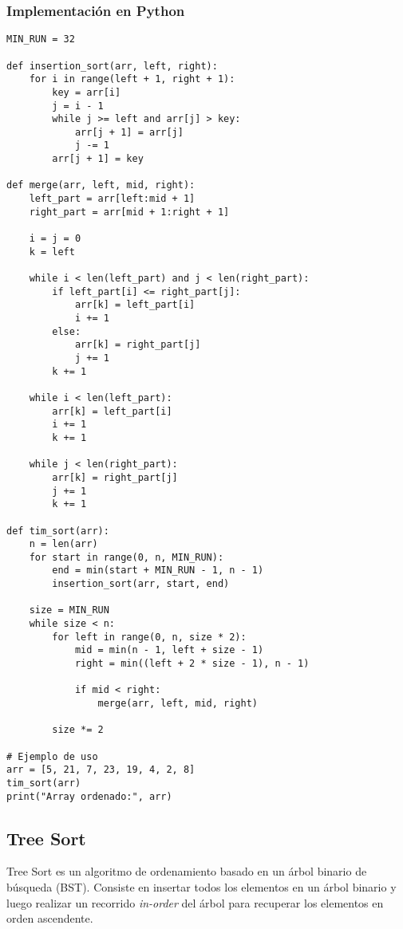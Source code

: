 \documentclass[11pt,openany]{book}
\begin{document}
\subsubsection{Implementación en Python}
\lstset{language=Python}
\begin{lstlisting}
MIN_RUN = 32

def insertion_sort(arr, left, right):
    for i in range(left + 1, right + 1):
        key = arr[i]
        j = i - 1
        while j >= left and arr[j] > key:
            arr[j + 1] = arr[j]
            j -= 1
        arr[j + 1] = key

def merge(arr, left, mid, right):
    left_part = arr[left:mid + 1]
    right_part = arr[mid + 1:right + 1]

    i = j = 0
    k = left

    while i < len(left_part) and j < len(right_part):
        if left_part[i] <= right_part[j]:
            arr[k] = left_part[i]
            i += 1
        else:
            arr[k] = right_part[j]
            j += 1
        k += 1

    while i < len(left_part):
        arr[k] = left_part[i]
        i += 1
        k += 1

    while j < len(right_part):
        arr[k] = right_part[j]
        j += 1
        k += 1

def tim_sort(arr):
    n = len(arr)
    for start in range(0, n, MIN_RUN):
        end = min(start + MIN_RUN - 1, n - 1)
        insertion_sort(arr, start, end)

    size = MIN_RUN
    while size < n:
        for left in range(0, n, size * 2):
            mid = min(n - 1, left + size - 1)
            right = min((left + 2 * size - 1), n - 1)

            if mid < right:
                merge(arr, left, mid, right)

        size *= 2

# Ejemplo de uso
arr = [5, 21, 7, 23, 19, 4, 2, 8]
tim_sort(arr)
print("Array ordenado:", arr)
\end{lstlisting}

\subsection{Tree Sort}Tree Sort es un algoritmo de ordenamiento basado en un árbol binario de búsqueda (BST). Consiste en insertar todos los elementos en un árbol binario y luego realizar un recorrido \textit{in-order} del árbol para recuperar los elementos en orden ascendente.
\end{document}
